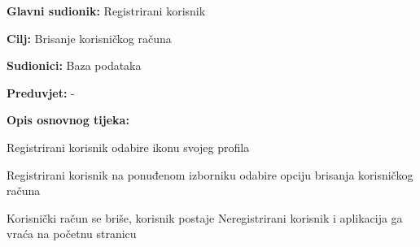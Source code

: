 				
				\noindent {}
				\begin{packed_item}
					
					\item \textbf{Glavni sudionik:} Registrirani korisnik
					\item  \textbf{Cilj:} Brisanje korisničkog računa
					\item  \textbf{Sudionici:} Baza podataka
					\item  \textbf{Preduvjet:} -
					
					\item  \textbf{Opis osnovnog tijeka:}
					\item[] \begin{packed_enum}
						\item Registrirani korisnik odabire ikonu svojeg profila
						\item Registrirani korisnik na ponuđenom izborniku odabire opciju brisanja korisničkog računa
						\item Korisnički račun se briše, korisnik postaje Neregistrirani korisnik i aplikacija ga vraća na početnu stranicu
					\end{packed_enum}
				\end{packed_item}
				
